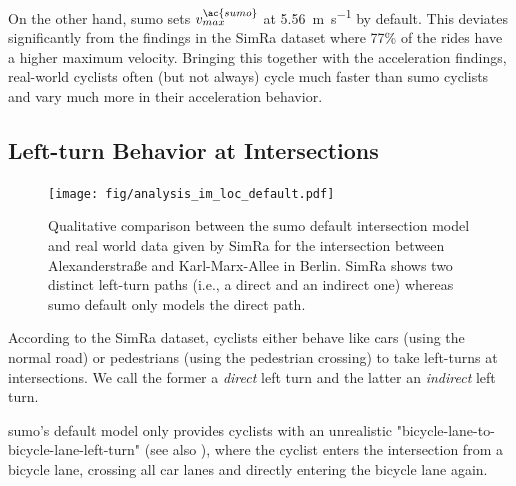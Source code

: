 On the other hand, \ac{sumo} sets $v_{max}^{\ac{sumo}}$ at \SI{5.56}{\metre\per\s} by default.
This deviates significantly from the findings in the SimRa dataset where \num{77}\% of the rides have a higher maximum velocity.
Bringing this together with the acceleration findings, real-world cyclists often (but not always) cycle much faster than \ac{sumo} cyclists and vary much more in their acceleration behavior.

\subsection{Left-turn Behavior at Intersections}
\label{subsec:left-turn_behavior_at_intersections_preprocessing}
\begin{figure}
    \centering
    \texttt{[image: fig/analysis\_im\_loc\_default.pdf]}
    \caption{%
        Qualitative comparison between the \ac{sumo} default intersection model and real world data given by SimRa for the intersection between Alexanderstraße and Karl-Marx-Allee in Berlin.
        SimRa shows two distinct left-turn paths (i.e., a direct and an indirect one) whereas \ac{sumo} default only models the direct path.
    }%
    \label{fig:analysis_im_traj_default}
\end{figure}

According to the SimRa dataset, cyclists either behave like cars (using the normal road) or pedestrians (using the pedestrian crossing) to take left-turns at intersections.
We call the former a \textit{direct} left turn and the latter an \textit{indirect} left turn.

\ac{sumo}'s default model only provides cyclists with an unrealistic "bicycle-lane-to-bicycle-lane-left-turn" (see also ), where the cyclist enters the intersection from a bicycle lane, crossing all car lanes and directly entering the bicycle lane again.

